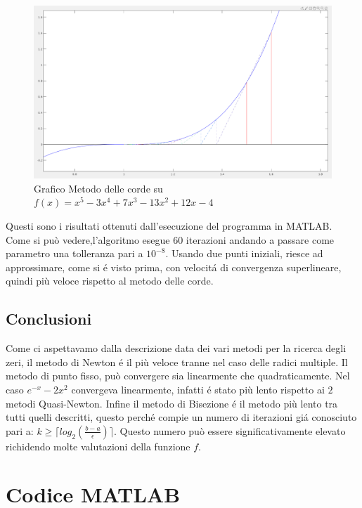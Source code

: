 \documentclass[12pt, letterpaper]{article}
\begin{document}
\begin{figure}[ht!]
    \includegraphics[scale=0.43]{MultiRadixSecantMethod.png}
    \caption{Grafico Metodo delle corde su $f(x)=x^5-3x^4+7x^3-13x^2+12x-4$}
\end{figure}
Questi sono i risultati ottenuti dall'esecuzione del programma in MATLAB.\\ Come si può vedere,l'algoritmo esegue 60 iterazioni andando a passare come parametro una tolleranza pari a $10^{-8}$.
Usando due punti iniziali, riesce ad approssimare, come si \'e visto prima, con velocit\'a di convergenza superlineare, quindi più veloce rispetto al metodo delle corde.


\subsection{Conclusioni}
Come ci aspettavamo dalla descrizione data dei vari metodi per la ricerca degli zeri, il metodo di Newton \'e il più veloce tranne nel caso delle radici multiple.
Il metodo di punto fisso, può convergere sia linearmente che quadraticamente. Nel caso $e^{-x}-2x^2$ convergeva linearmente, infatti \'e stato più lento rispetto ai $2$ metodi Quasi-Newton.
Infine il metodo di Bisezione \'e il metodo più lento tra tutti quelli descritti, questo perch\'e compie un numero di iterazioni gi\'a conosciuto pari a: $k \geq \lceil log_2(\frac{b-a}{\epsilon}) \rceil$. Questo numero può essere significativamente elevato richidendo 
molte valutazioni della funzione $f$.

\newpage

\section{Codice MATLAB}
\end{document}
